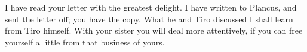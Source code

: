 

 I have read your letter with the greatest delight. I have written to Plancus, and sent the letter off; you have the copy. What he and Tiro discussed I shall learn from Tiro himself. With your sister you will deal more attentively, if you can free yourself a little from that business of yours.
